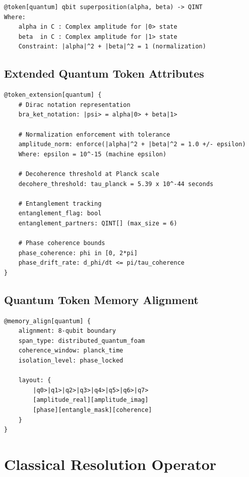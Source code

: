 \documentclass[12pt,a4paper]{article}
\begin{document}
\begin{lstlisting}[style=riftlang,caption={Quantum Token Base Definition}]
@token[quantum] qbit superposition(alpha, beta) -> QINT
Where:
    alpha in C : Complex amplitude for |0> state
    beta  in C : Complex amplitude for |1> state
    Constraint: |alpha|^2 + |beta|^2 = 1 (normalization)
\end{lstlisting}

\subsection{Extended Quantum Token Attributes}

\begin{lstlisting}[style=riftlang,caption={Quantum Token Extensions}]
@token_extension[quantum] {
    # Dirac notation representation
    bra_ket_notation: |psi> = alpha|0> + beta|1>
    
    # Normalization enforcement with tolerance
    amplitude_norm: enforce(|alpha|^2 + |beta|^2 = 1.0 +/- epsilon)
    Where: epsilon = 10^-15 (machine epsilon)
    
    # Decoherence threshold at Planck scale
    decohere_threshold: tau_planck = 5.39 x 10^-44 seconds
    
    # Entanglement tracking
    entanglement_flag: bool
    entanglement_partners: QINT[] (max_size = 6)
    
    # Phase coherence bounds
    phase_coherence: phi in [0, 2*pi]
    phase_drift_rate: d_phi/dt <= pi/tau_coherence
}
\end{lstlisting}

\subsection{Quantum Token Memory Alignment}

\begin{lstlisting}[style=riftlang,caption={Memory Alignment Specification}]
@memory_align[quantum] {
    alignment: 8-qubit boundary
    span_type: distributed_quantum_foam
    coherence_window: planck_time
    isolation_level: phase_locked
    
    layout: {
        |q0>|q1>|q2>|q3>|q4>|q5>|q6>|q7>
        [amplitude_real][amplitude_imag]
        [phase][entangle_mask][coherence]
    }
}
\end{lstlisting}

\section{Classical Resolution Operator}
\end{document}

